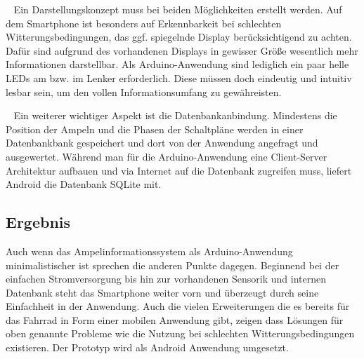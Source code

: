 \begin{description}[leftmargin=0.7cm,style=nextline]
  \item[Darstellung] ~ Ein Darstellungskonzept muss bei beiden Möglichkeiten erstellt werden. Auf dem \gls{Smartphone} ist besonders auf Erkennbarkeit bei schlechten Witterungsbedingungen, das ggf. spiegelnde Display berücksichtigend zu achten. Dafür sind aufgrund des vorhandenen Displays in gewisser Größe wesentlich mehr Informationen darstellbar. Als \gls{Arduino}-Anwendung sind lediglich ein paar helle \glspl{LED} am bzw. im Lenker erforderlich. Diese müssen doch eindeutig und intuitiv lesbar sein, um den vollen Informationsumfang zu gewähreisten.\\
 \item[Datenbankanbindung] ~ Ein weiterer wichtiger Aspekt ist die Datenbankanbindung. Mindestens die Position der Ampeln und die Phasen der Schaltpläne werden in einer Datenbankbank gespeichert und dort von der Anwendung angefragt und ausgewertet. Während man für die \gls{Arduino}-Anwendung eine Client-Server Architektur aufbauen und via Internet auf die Datenbank zugreifen muss, liefert Android die Datenbank SQLite mit.\\
\end{description}
\subsection*{Ergebnis}  
Auch wenn das Ampelinformationssystem als \gls{Arduino}-Anwendung minimalistischer ist sprechen die anderen Punkte dagegen. Beginnend bei der einfachen Stromversorgung bis hin zur vorhandenen Sensorik und internen Datenbank steht das \gls{Smartphone} weiter vorn und überzeugt durch seine Einfachheit in der Anwendung. Auch die vielen Erweiterungen die es bereits für das Fahrrad in Form einer mobilen Anwendung gibt, zeigen dass Lösungen für oben genannte Probleme wie die Nutzung bei schlechten Witterungsbedingungen existieren. Der Prototyp wird als Android Anwendung umgesetzt.
